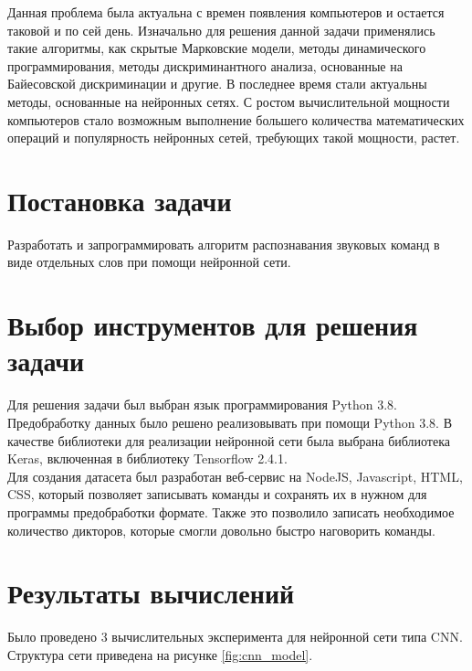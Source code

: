 \documentclass[14pt]{article}
\begin{document}
    Данная проблема была актуальна с времен появления компьютеров и остается таковой и по сей день. Изначально для решения данной задачи применялись такие алгоритмы, как скрытые Марковские модели, методы динамического программирования, методы дискриминантного анализа, основанные на Байесовской дискриминации и другие. В последнее время стали актуальны методы, основанные на нейронных сетях. С ростом вычислительной мощности компьютеров стало возможным выполнение большего количества математических операций и популярность нейронных сетей, требующих такой мощности, растет. 

\section*{Постановка задачи}
Разработать и запрограммировать алгоритм распознавания звуковых команд в виде отдельных слов при помощи нейронной сети.

\section*{Выбор инструментов для решения задачи}
Для решения задачи был выбран язык программирования Python 3.8. Предобработку данных было решено реализовывать при помощи Python 3.8.
В качестве библиотеки для реализации нейронной сети была выбрана библиотека Keras, включенная в библиотеку Tensorflow 2.4.1. \\

Для создания датасета был разработан веб-сервис на NodeJS, Javascript, HTML, CSS, который позволяет записывать команды и сохранять их в нужном для программы предобработки формате. Также это позволило записать необходимое количество дикторов, которые смогли довольно быстро наговорить команды.
\newpage

\section*{Результаты вычислений}
Было проведено 3 вычислительных эксперимента для нейронной сети типа CNN. Структура сети приведена на рисунке \ref{fig:cnn_model}.
\end{document}
